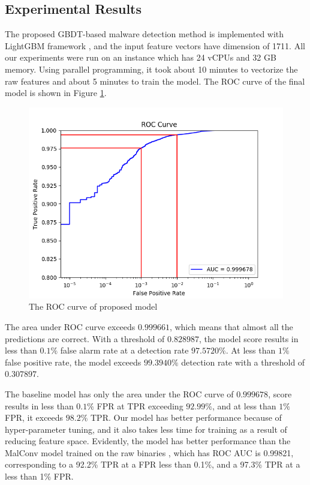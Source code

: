 \documentclass[runningheads]{llncs}
\begin{document}
\subsection{Experimental Results}

The proposed GBDT-based malware detection method is implemented with LightGBM framework \cite{ke2017lightgbm}, and the input feature vectors have dimension of 1711. All our experiments were run on an instance which has 24 vCPUs and 32 GB memory. Using parallel programming, it took about 10 minutes to vectorize the raw features and about 5 minutes to train the model. The ROC curve of the final model is shown in Figure \ref{fig:roc_curve_with_highlights}.

\begin{figure}[h]
\centering
\includegraphics[width=\textwidth]{roc_curve_with_highlights.png}
\caption{The ROC curve of proposed model}
\label{fig:roc_curve_with_highlights}
\end{figure}

The area under ROC curve exceeds $0.999661$, which means that almost all the predictions are correct. With a threshold of $0.828987$, the model score results in less than $0.1\%$ false alarm rate at a detection rate $97.5720\%$. At less than $1\%$ false positive rate, the model exceeds $99.3940\%$ detection rate with a threshold of $0.307897$. 

The baseline model has only the area under the ROC curve of $0.999678$, score results in less than $0.1\%$ FPR at TPR exceeding $92.99\%$, and at less than $1\%$ FPR, it exceeds $98.2\%$ TPR. Our model has better performance because of hyper-parameter tuning, and it also takes less time for training as a result of reducing feature space. Evidently, the model has better performance than the MalConv model trained on the raw binaries \cite{anderson2018ember}, which has ROC AUC is 0.99821, corresponding to a 92.2\% TPR at a FPR less than 0.1\%, and a 97.3\% TPR at a less than 1\% FPR.
\end{document}
